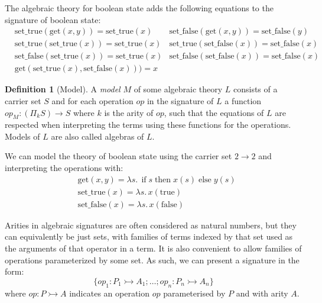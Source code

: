 \documentclass[acmsmall, screen, nonacm]{acmart}
\theoremstyle{definition}
\newtheorem{definition}{Definition}[section]
\newcommand{\types}{\mathrel{:}}
\newcommand{\mif}{\mathop{\mathrm{if}}}
\newcommand{\mthen}{\mathop{\mathrm{then}}}
\newcommand{\melse}{\mathop{\mathrm{else}}}
\begin{document}
\begin{example}
  The algebraic theory for boolean state adds the following equations to
  the signature of boolean state:
  \begin{align*}
    &\mathrm{set\_true}(\mathrm{get}(x, y)) = \mathrm{set\_true}(x)
    &\mathrm{set\_false}(\mathrm{get}(x, y)) = \mathrm{set\_false}(y) \\
    &\mathrm{set\_true}(\mathrm{set\_true}(x)) = \mathrm{set\_true}(x)
    &\mathrm{set\_true}(\mathrm{set\_false}(x)) = \mathrm{set\_false}(x) \\
    &\mathrm{set\_false}(\mathrm{set\_true}(x)) = \mathrm{set\_true}(x)
    &\mathrm{set\_false}(\mathrm{set\_false}(x)) = \mathrm{set\_false}(x) \\
    &\mathrm{get}(\mathrm{set\_true}(x), \mathrm{set\_false}(x))) = x
  \end{align*}
\end{example}

\begin{definition}[Model]
  A \emph{model} $M$ of some algebraic theory $L$ consists of a carrier
  set $S$ and for each operation $op$ in the signature of $L$ a function
  $op_M : (\Pi_k S) \rightarrow S$ where $k$ is the arity of $op$, such
  that the equations of $L$ are respected when interpreting the terms
  using these functions for the operations. Models of $L$ are also
  called algebras of $L$.
\end{definition}

\begin{example}
  We can model the theory of boolean state using the carrier set
  $2 \rightarrow 2$ and interpreting the operations with:
  \begin{align*}
    &\mathrm{get}(x, y) = \lambda s.\, \mif s \mthen x(s) \melse y(s) \\
    &\mathrm{set\_true}(x) = \lambda s.\, x(\mathrm{true}) \\
    &\mathrm{set\_false}(x) = \lambda s.\, x(\mathrm{false})
  \end{align*}
\end{example}

Arities in algebraic signatures are often considered as natural numbers,
but they can equivalently be just sets, with families of terms indexed
by that set used as the arguments of that operator in a term. It is also
convenient to allow families of operations parameterized by some set. As
such, we can present a signature in the form:
\begin{equation*}
\{ op_1 \types P_1 \rightarrowtail A_1; \ldots; op_n
\types P_n \rightarrowtail A_n \}
\end{equation*}
where $op \types P \rightarrowtail A$ indicates an operation $op$
parameterised by $P$ and with arity $A$.
\end{document}
